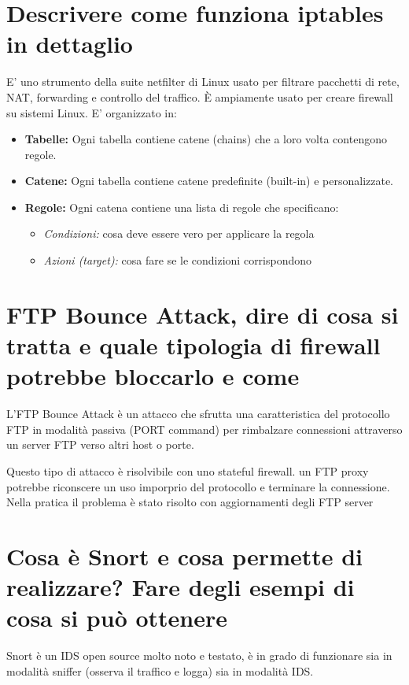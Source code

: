 \documentclass{report}
\begin{document}
\section{Descrivere come funziona iptables in dettaglio}
E' uno strumento della suite netfilter di Linux usato per filtrare pacchetti di rete, NAT, forwarding e controllo del traffico. È ampiamente usato per creare firewall su sistemi Linux.
E' organizzato in:
\begin{itemize}
    \item \textbf{Tabelle:} Ogni tabella contiene catene (chains) che a loro volta contengono regole.
    \item \textbf{Catene:} Ogni tabella contiene catene predefinite (built-in) e personalizzate.
    \item \textbf{Regole:} Ogni catena contiene una lista di regole che specificano:
    \begin{itemize}
        \item \textit{Condizioni: }cosa deve essere vero per applicare la regola
        \item \textit{Azioni (target):} cosa fare se le condizioni corrispondono
    \end{itemize}
\end{itemize}

\section{FTP Bounce Attack, dire di cosa si tratta e quale
tipologia di firewall potrebbe bloccarlo e come}
L'FTP Bounce Attack è un attacco che sfrutta una caratteristica del protocollo FTP in modalità passiva (PORT command) 
per rimbalzare connessioni attraverso un server FTP verso altri host o porte.

\noindent Questo tipo di attacco è risolvibile con uno stateful firewall. un FTP proxy potrebbe riconscere un uso
imporprio del protocollo e terminare la connessione.
Nella pratica il problema è stato risolto con aggiornamenti degli FTP server

\section{Cosa è Snort e cosa permette di realizzare? Fare degli esempi di cosa si può ottenere}
Snort è un IDS open source molto noto e testato, è in grado di funzionare sia in modalità sniffer (osserva il traffico e logga) sia in modalità IDS.
\end{document}
